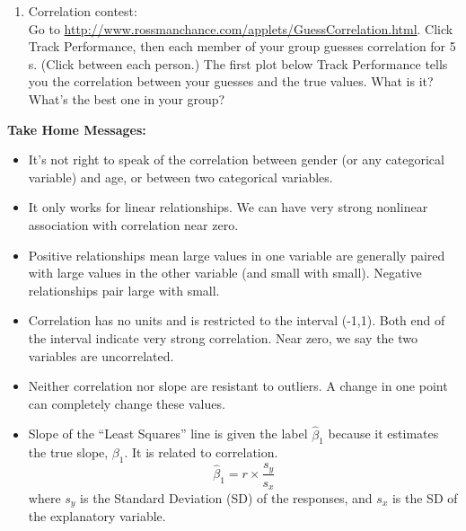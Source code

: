 \begin{enumerate}
\item Correlation contest:\\
  Go to
  \url{http://www.rossmanchance.com/applets/GuessCorrelation.html}.
  Click \fbox{$\surd$} {\sf Track Performance}, then each member of your
  group guesses correlation for 5 s. (Click  between each person.)  The first plot
  below {\sf Track Performance} tells you the correlation between your
  guesses and the true values.  What  is it? What's the best one in
  your group? 
\begin{students} 
\vspace{1cm}\newpage
\end{students}



\end{enumerate}

\begin{center}
  {\bf Take Home Messages:}\vspace{-.4cm}
\end{center}
\begin{itemize}
\item It's not right to speak of the correlation between gender (or any
  categorical variable) and age, or between two categorical variables.
\item It only works for linear relationships.  We can have very strong
  nonlinear association with correlation near zero.
\item Positive relationships mean large values in one variable are
  generally  paired  with large values  in  the other variable
  (and small with small).  Negative relationships pair large with small.
\item Correlation has no units and is restricted to the interval
  (-1,1). Both end of the interval indicate very strong
  correlation. Near zero, we say the two variables are uncorrelated.

\item Neither correlation nor slope are resistant to outliers.  A
  change in one point can completely change these values.
\item Slope of the ``Least Squares'' line is given the label
  $\hat{\beta}_1$ because it estimates the true slope, $\beta_1$.  It is
  related to correlation.  
  $$  \hat{\beta}_1 = r \times\frac{s_y}{s_x}$$
  where $s_y$ is the Standard Deviation (SD) of the responses, and $s_x$ is
  the SD of the explanatory variable.
\end{itemize}





